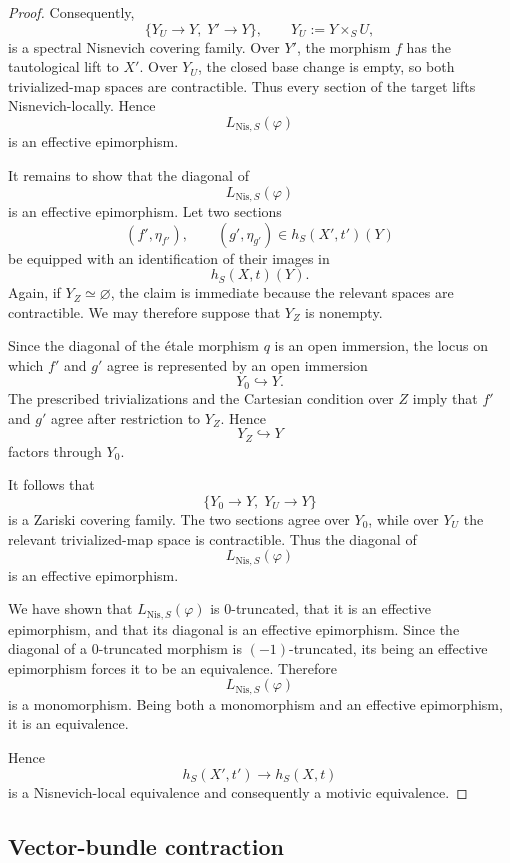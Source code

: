 \begin{proof}
Consequently,
\[
    \{Y_U\to Y,\;Y'\to Y\},
    \qquad
    Y_U:=Y\times_SU,
\]
is a spectral Nisnevich covering family.  Over \(Y'\), the morphism
\(f\) has the tautological lift to \(X'\).  Over \(Y_U\), the closed
base change is empty, so both trivialized-map spaces are contractible.
Thus every section of the target lifts Nisnevich-locally.  Hence
\[
    L_{\mathrm{Nis},S}(\varphi)
\]
is an effective epimorphism.

It remains to show that the diagonal of
\[
    L_{\mathrm{Nis},S}(\varphi)
\]
is an effective epimorphism.  Let two sections
\[
    (f',\eta_{f'}),
    \qquad
    (g',\eta_{g'})
    \in
    h_S(X',t')(Y)
\]
be equipped with an identification of their images in
\[
    h_S(X,t)(Y).
\]
Again, if \(Y_Z\simeq\varnothing\), the claim is immediate because the
relevant spaces are contractible.  We may therefore suppose that
\(Y_Z\) is nonempty.

Since the diagonal of the étale morphism \(q\) is an open immersion,
the locus on which \(f'\) and \(g'\) agree is represented by an open
immersion
\[
    Y_0
    \hookrightarrow
    Y.
\]
The prescribed trivializations and the Cartesian condition over \(Z\)
imply that \(f'\) and \(g'\) agree after restriction to \(Y_Z\).
Hence
\[
    Y_Z
    \hookrightarrow
    Y
\]
factors through \(Y_0\).

It follows that
\[
    \{Y_0\to Y,\;Y_U\to Y\}
\]
is a Zariski covering family.  The two sections agree over \(Y_0\),
while over \(Y_U\) the relevant trivialized-map space is contractible.
Thus the diagonal of
\[
    L_{\mathrm{Nis},S}(\varphi)
\]
is an effective epimorphism.

We have shown that \(L_{\mathrm{Nis},S}(\varphi)\) is \(0\)-truncated,
that it is an effective epimorphism, and that its diagonal is an
effective epimorphism.  Since the diagonal of a \(0\)-truncated
morphism is \((-1)\)-truncated, its being an effective epimorphism
forces it to be an equivalence.  Therefore
\[
    L_{\mathrm{Nis},S}(\varphi)
\]
is a monomorphism.  Being both a monomorphism and an effective
epimorphism, it is an equivalence.

Hence
\[
    h_S(X',t')
    \longrightarrow
    h_S(X,t)
\]
is a Nisnevich-local equivalence and consequently a motivic
equivalence.
\end{proof}

\subsection{Vector-bundle contraction}

